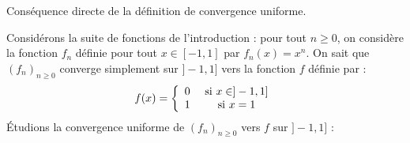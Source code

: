 \documentclass[a4paper,10pt]{report}
\begin{document}
\begin{Demonstration}{} Conséquence directe de la définition de convergence uniforme.
%
\end{Demonstration}

\medskip

\begin{Exemple} Considérons la suite de fonctions de l'introduction : pour tout $n \geq 0$, on considère la fonction $f_n$ définie pour tout $x \in [-1,1]$ par $f_n(x)=x^n$. On sait que $(f_n)_{n \geq 0}$ converge simplement sur $]-1,1]$ vers la fonction $f$ définie par :
$$ f(x) = \left\lbrace \begin{array}{ccl}
0 & \hbox{ si } x \in ]-1,1] \\
1 & \hbox{ si } x =1 \\
\end{array}\right. $$
Étudions la convergence uniforme de $(f_n)_{n \geq 0}$ vers $f$ sur $]-1,1]$ :

\vspace{7cm}
\end{Exemple}

%
%
%
%
%
%
%
%
%
\end{document}
